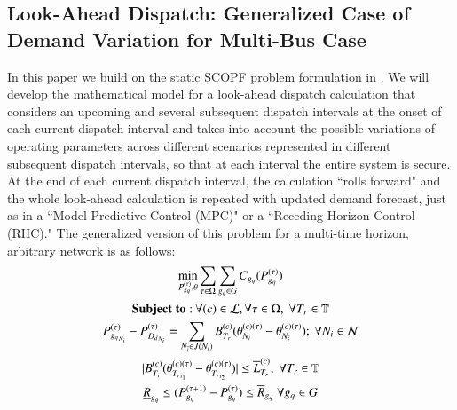 \documentclass[preprint,12pt,3p]{elsarticle}
\begin{document}
\subsection{Look-Ahead Dispatch: Generalized Case of Demand Variation for Multi-Bus Case}
In this paper we build on the static SCOPF problem formulation in \cite{CK:14}. We will develop the mathematical model for a look-ahead dispatch calculation that considers an upcoming and several subsequent dispatch intervals at the onset of each current dispatch interval and takes into account the possible variations of operating parameters across different scenarios represented in different subsequent dispatch intervals, so that at each interval the entire system is secure. At the end of each current dispatch interval, the calculation ``rolls forward" and the whole look-ahead calculation is repeated with updated demand forecast, just as in a ``Model Predictive Control (MPC)" or a ``Receding Horizon Control (RHC)." The generalized version of this problem for a multi-time horizon, arbitrary network is as follows:
\begin{subequations}\label{Look-Ahead_General_Ang_Inc}
\begin{gather}
\min_{P_{g_q}^{(\tau)},\theta}\sum_{\tau\in \Omega}\sum_{g_q\in G}C_{g_q}(P_{g_q}^{(\tau)})\label{first_Look-Ahead_General_Ang_Inc}\\
\mathbf{Subject\;to:}\:\forall(c)\in\mathcal{L},\forall \tau \in \Omega,\;\forall T_r\in \mathbb{T}\notag\\
P_{{g_q}_{N_i}}^{(\tau)}-P_{{D_d}_{N_i}}^{(\tau)}=\sum_{N_{\overline{i}}\in{J(N_i)}}B_{T_r}^{(c)}(\theta_{N_i}^{(c)(\tau)}-\theta_{N_{\overline{i}}}^{(c)(\tau)});\ \forall{{N_i}\in\mathcal{N}}\label{second I_Look-Ahead_General_Ang_Inc}\\
|B_{T_r}^{(c)}(\theta_{{T_r}_{t_1}}^{(c)(\tau)}-\theta_{{T_r}_{t_2}}^{(c)(\tau)})|\leq{{\overline{L}}_{T_r}^{(c)}},\;\forall{T_r\in{\mathbb{T}}}\label{fourth_Look-Ahead_General_Ang_Inc}\\
\underline{R}_{g_q}\leq(P_{g_q}^{(\tau+1)}-P_{g_q}^{(\tau)})\leq \overline{R}_{g_q}\; \forall {g_q}\in G\label{fifth_Look-Ahead_General_Ang_Inc}
\end{gather}
\end{subequations}
\end{document}
